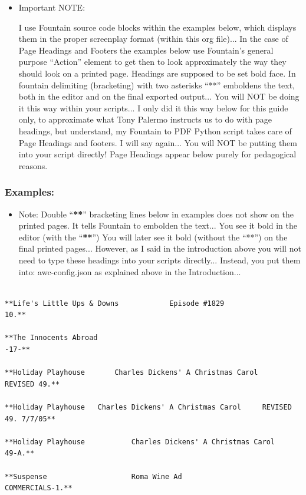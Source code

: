 \documentclass[openleft,oneside,showtrims]{memoir}
\begin{document}
\begin{itemize}
\item Important NOTE:
\label{sec:org6e07a17}

I use Fountain source code blocks within the examples below, which displays them in the proper screenplay format (within this org file)... In the case of Page Headings and Footers the examples below use Fountain's general purpose ``Action'' element to get then to look approximately the way they should look on a printed page. Headings are supposed to be set bold face.  In fountain delimiting (bracketing) with two asterisks ``**'' emboldens the text, both in the editor and on the final exported output... You will NOT be doing it this way within your scripts... I only did it this way below for this guide only, to approximate what Tony Palermo instructs us to do with page headings, but understand, my Fountain to PDF Python script takes care of Page Headings and footers. I will say again... You will NOT be putting them into your script directly! Page Headings appear below purely for pedagogical reasons.
\end{itemize}

\subsubsection*{Examples:}
\label{sec:org9e06b6a}

\begin{itemize}
\item Note: Double ``\textbf{**}'' bracketing lines below in examples does not show on the printed pages.  It tells Fountain to embolden the text...  You see it bold in the editor (with the ``\textbf{**}'') You will later see it bold (without the ``**'') on the final printed pages... However, as I said in the introduction above you will not need to type these headings into your scripts directly... Instead, you put them into: awc-config.json as explained above in the Introduction...
\end{itemize}

\lstset{language=fountain,label= ,caption= ,captionpos=b,numbers=none}
\begin{lstlisting}

**Life's Little Ups & Downs            Episode #1829                        10.**

**The Innocents Abroad                                                     -17-**

**Holiday Playhouse       Charles Dickens' A Christmas Carol        REVISED 49.**

**Holiday Playhouse   Charles Dickens' A Christmas Carol     REVISED 49. 7/7/05**

**Holiday Playhouse           Charles Dickens' A Christmas Carol          49-A.**

**Suspense                    Roma Wine Ad                       COMMERCIALS-1.**

\end{lstlisting}
\end{document}
